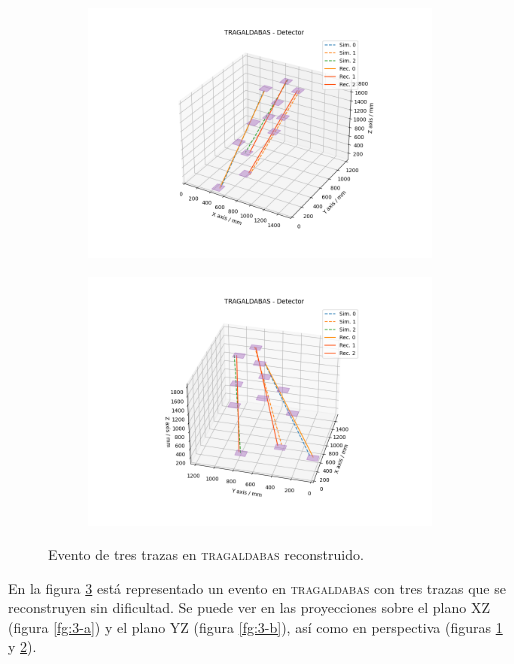 \documentclass[a4paper]{article}
\begin{document}
\begin{figure}[H]
\begin{subfigure}[b]{0.5\linewidth}
    \centering
    \includegraphics[trim={3.5cm 1cm 2.5cm 1.9cm},clip,width=\linewidth]{tragaldabas_angle1.png} 
    \caption{} 
    \label{fg:3-c} 
  \end{subfigure}%
  \begin{subfigure}[b]{0.5\linewidth}
    \centering
    \includegraphics[trim={2.5cm 1cm 2.5cm 1.9cm},clip,width=\linewidth]{tragaldabas_angle2.png} 
    \caption{} 
    \label{fg:3-d} 
  \end{subfigure} 
  \caption{Evento de tres trazas en \textsc{tragaldabas} reconstruido.}
  \label{fg:3} 
\end{figure}

En la figura \ref{fg:3} está representado un evento en \textsc{tragaldabas} con tres trazas que se reconstruyen sin dificultad. Se puede ver en las proyecciones sobre el plano XZ (figura \ref{fg:3-a}) y el plano YZ (figura \ref{fg:3-b}), así como en perspectiva (figuras \ref{fg:3-c} y \ref{fg:3-d}). 
\end{document}
